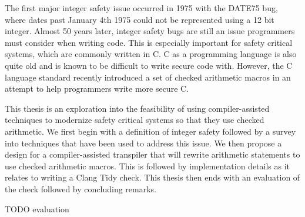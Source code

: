 \abstract

The first major integer safety issue occurred in 1975 with the DATE75 bug, where dates past January 4th 1975 could not be represented using a 12 bit integer. Almost 50 years later, integer safety bugs are still an issue programmers must consider when writing code. This is especially important for safety critical systems, which are commonly written in C. C as a programming language is also quite old and is known to be difficult to write secure code with. However, the C language standard recently introduced a set of checked arithmetic macros in an attempt to help programmers write more secure C.

This thesis is an exploration into the feasibility of using compiler-assisted techniques to modernize safety critical systems so that they use checked arithmetic. We first begin with a definition of integer safety followed by a survey into techniques that have been used to address this issue. We then propose a design for a compiler-assisted transpiler that will rewrite arithmetic statements to use checked arithmetic macros. This is followed by implementation details as it relates to writing a Clang Tidy check. This thesis then ends with an evaluation of the check followed by concluding remarks.

TODO evaluation
